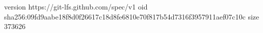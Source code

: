 version https://git-lfs.github.com/spec/v1
oid sha256:09fd9aabe18f8d0f26617c18d8fe6810e70f817b54d7316f3957911aef07c10c
size 373626
